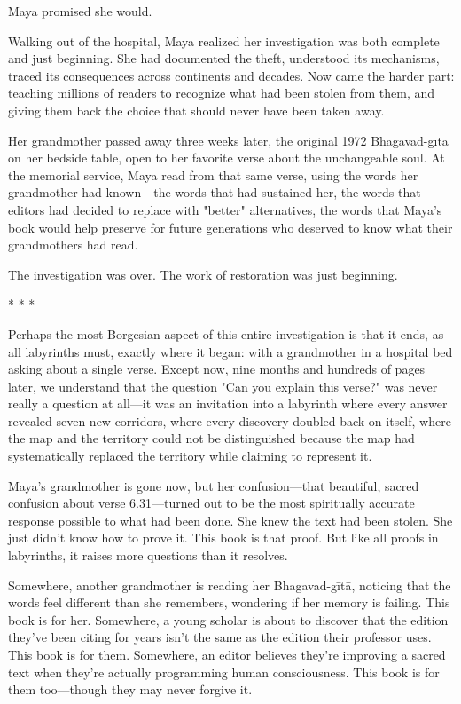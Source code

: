 \documentclass[12pt,twoside]{book}
\begin{document}
Maya promised she would.

Walking out of the hospital, Maya realized her investigation was both complete and just beginning. She had documented the theft, understood its mechanisms, traced its consequences across continents and decades. Now came the harder part: teaching millions of readers to recognize what had been stolen from them, and giving them back the choice that should never have been taken away.

Her grandmother passed away three weeks later, the original 1972 Bhagavad-gītā on her bedside table, open to her favorite verse about the unchangeable soul. At the memorial service, Maya read from that same verse, using the words her grandmother had known—the words that had sustained her, the words that editors had decided to replace with "better" alternatives, the words that Maya's book would help preserve for future generations who deserved to know what their grandmothers had read.

The investigation was over. The work of restoration was just beginning.

\begin{center}
* * *
\end{center}

Perhaps the most Borgesian aspect of this entire investigation is that it ends, as all labyrinths must, exactly where it began: with a grandmother in a hospital bed asking about a single verse. Except now, nine months and hundreds of pages later, we understand that the question "Can you explain this verse?" was never really a question at all—it was an invitation into a labyrinth where every answer revealed seven new corridors, where every discovery doubled back on itself, where the map and the territory could not be distinguished because the map had systematically replaced the territory while claiming to represent it.

Maya's grandmother is gone now, but her confusion—that beautiful, sacred confusion about verse 6.31—turned out to be the most spiritually accurate response possible to what had been done. She knew the text had been stolen. She just didn't know how to prove it. This book is that proof. But like all proofs in labyrinths, it raises more questions than it resolves.

Somewhere, another grandmother is reading her Bhagavad-gītā, noticing that the words feel different than she remembers, wondering if her memory is failing. This book is for her. Somewhere, a young scholar is about to discover that the edition they've been citing for years isn't the same as the edition their professor uses. This book is for them. Somewhere, an editor believes they're improving a sacred text when they're actually programming human consciousness. This book is for them too—though they may never forgive it.
\end{document}
